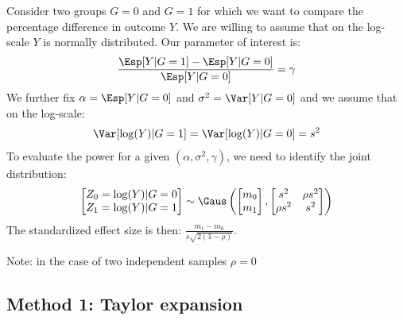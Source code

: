\documentclass[12pt]{article}
\begin{document}
Consider two groups \(G=0\) and \(G=1\) for which we want to compare
the percentage difference in outcome \(Y\). We are willing to assume
that on the log-scale \(Y\) is normally distributed. Our parameter of
interest is:
\begin{align*}
\frac{\Esp[Y|G=1]-\Esp[Y|G=0]}{\Esp[Y|G=0]} = \gamma
\end{align*}
We further fix \(\alpha = \Esp[Y|G=0]\) and \(\sigma^2 = \Var[Y|G=0]\)
and we assume that on the log-scale:
\begin{align*}
\Var[\log(Y)|G=1]  = \Var[\log(Y)|G=0] = s^2
\end{align*}
To evaluate the power for a given \((\alpha,\sigma^2,\gamma)\), we need to identify the joint distribution: 
\begin{align*}
\begin{bmatrix}
Z_0 = \log(Y)|G=0 \\ Z_1  = \log(Y)|G=1
\end{bmatrix}
\sim \Gaus \left(
\begin{bmatrix}
m_0 \\ m_1
\end{bmatrix}
,
\begin{bmatrix}
s^2 & \rho s^2 \\ \rho s^2 & s^2
\end{bmatrix}
\right)
\end{align*}
The standardized effect size is then: \(\frac{m_1-m_0}{s\sqrt{2(1-\rho)}}\). 

\bigskip

Note: in the case of two independent samples \(\rho=0\)

\subsection{Method 1: Taylor expansion}
\label{sec:orgceae543}
\end{document}
